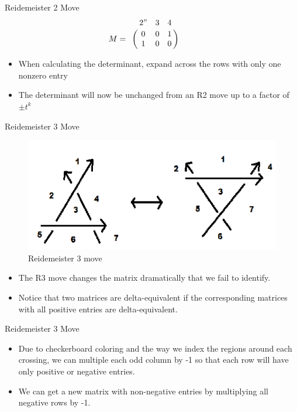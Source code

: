 \documentclass[10pt]{beamer}
\begin{document}
\begin{frame}{Reidemeister 2 Move}
  \[
  M=
  \bordermatrix{ & 2" & 3 & 4 \cr
  & 0 & 0 & 1 \cr
  & 1 & 0 & 0 } \qquad
  \]
  \begin{itemize}
  \item When calculating the determinant, expand across the rows with only one nonzero entry
  \item The determinant will now be unchanged from an R2 move up to a factor of $ \pm t^k $
  \end{itemize}
\end{frame}

\begin{frame}{Reidemeister 3 Move}
\begin{figure}
  \includegraphics[scale=0.5]{R3.png}
  \caption{Reidemeister 3 move}
  \end{figure}
   \begin{itemize}
 \item The R3 move changes the matrix dramatically that we fail to identify.
\item Notice that two matrices are delta-equivalent if the corresponding matrices with all positive entries are delta-equivalent.


\end{itemize}
\end{frame}

\begin{frame}{Reidemeister 3 Move}

   \begin{itemize}
\item Due to checkerboard coloring and the way we index the regions around each crossing, we can multiple each odd column by -1 so that each row will have only positive or negative entries.
\item We can get a new matrix with non-negative entries by multiplying all negative rows by -1.

\end{itemize}
\end{frame}
\end{document}
